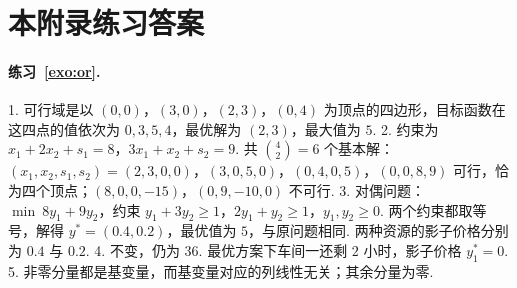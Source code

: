 \section*{本附录练习答案}

\paragraph*{练习~\ref{exo:or}.}
1. 可行域是以 $(0,0)$，$(3,0)$，$(2,3)$，$(0,4)$ 为顶点的四边形，目标函数在这四点的值依次为 $0,3,5,4$，最优解为 $(2,3)$，最大值为 $5$.
2. 约束为 $x_1+2x_2+s_1=8$，$3x_1+x_2+s_2=9$. 共 $\binom42=6$ 个基本解：$(x_1,x_2,s_1,s_2)=(2,3,0,0)$，$(3,0,5,0)$，$(0,4,0,5)$，$(0,0,8,9)$ 可行，恰为四个顶点；$(8,0,0,-15)$，$(0,9,-10,0)$ 不可行.
3. 对偶问题：$\min\ 8y_1+9y_2$，约束 $y_1+3y_2\ge1$，$2y_1+y_2\ge1$，$y_1,y_2\ge0$. 两个约束都取等号，解得 $y^*=(0.4,0.2)$，最优值为 $5$，与原问题相同. 两种资源的影子价格分别为 $0.4$ 与 $0.2$.
4. 不变，仍为 $36$. 最优方案下车间一还剩 $2$ 小时，影子价格 $y_1^*=0$.
5. 非零分量都是基变量，而基变量对应的列线性无关；其余分量为零.
